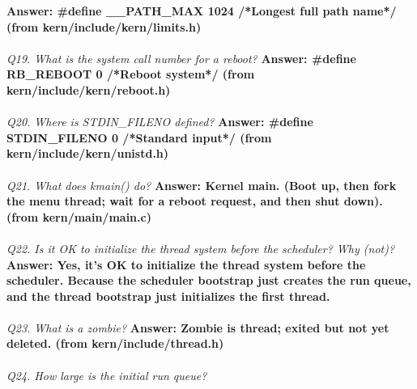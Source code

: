 \documentclass[11pt, english]{article}
\begin{document}
	\textbf{Answer:	\#define \_\_PATH\_MAX 1024 /*Longest full path name*/ (from kern/include/kern/limits.h)}\\ \\
	\textit{Q19.  What is the system call number for a reboot?}\newline 
	\textbf{Answer: \#define RB\_REBOOT 0 /*Reboot system*/ (from kern/include/kern/reboot.h)}\\ \\ 
	\textit{Q20. Where is STDIN\_FILENO defined?}\newline 
	\textbf{Answer: \#define STDIN\_FILENO  0 /*Standard input*/ (from kern/include/kern/unistd.h)}\\ \\ 
	\textit{Q21. What does kmain() do?}\newline 
	\textbf{Answer: Kernel main. (Boot up, then fork the menu thread; wait for a reboot request, and then shut down). (from kern/main/main.c)}\\ \\ 
	\textit{Q22. Is it OK to initialize the thread system before the scheduler? Why (not)?}\newline 
	\textbf{Answer: Yes, it’s OK to initialize the thread system before the scheduler. Because the scheduler bootstrap just creates the run queue, and the thread bootstrap just initializes the first thread.}\\ \\ 
	\textit{Q23. What is a zombie?}\newline 
	\textbf{Answer: Zombie is thread; exited but not yet deleted. (from kern/include/thread.h)}\\ \\ 
	\textit{Q24. How large is the initial run queue?}\newline 
\end{document}

